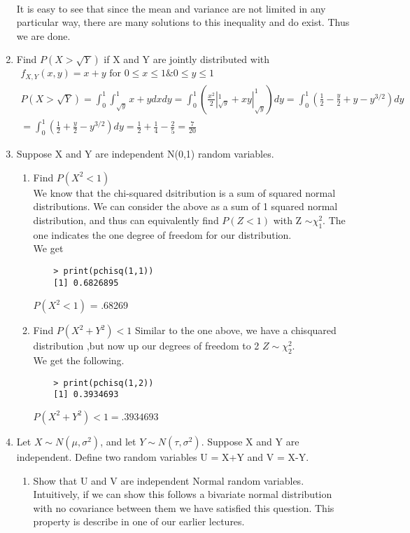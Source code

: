 \documentclass[11pt]{article}
\begin{document}
\begin{enumerate}
\begin{gather}
\end{gather}
It is easy to see that since the mean and variance are not limited in any particular way, there are many solutions to this inequality and do exist. Thus we are done.
\item Find $P(	X>\sqrt{Y})$ if X and Y are jointly distributed with
\begin{gather}
	f_{X,Y}(x,y)=x+y \text{ for } 0\le x \le 1 \& 0\le y\le1\\
	P(X>\sqrt{Y}) = \int_{0}^{1} \int_{\sqrt{y}}^{1} x+y dx dy = \int_{0}^{1} (\frac{x^2}{2}|_{\sqrt{y}}^1 + xy|_{\sqrt{y}}^1)dy = \int_{0}^{1} (\frac{1}{2}-\frac{y}{2} + y -y^{3/2})dy\\
	= \int_{0}^{1} (\frac{1}{2} + \frac{y}{2} - y^{3/2})dy = \frac{1}{2} + \frac{1}{4} - \frac{2}{5} = \frac{7}{20}
\end{gather}
\item Suppose X and Y are independent N(0,1) random variables. 
\begin{enumerate}
	\item Find $P(X^2<1)$\\
	We know that the chi-squared dsitribution is a sum of squared normal distributions. We can consider the above as a sum of 1 squared normal distribution, and thus can equivalently find $P(Z<1)$ with Z $\sim \chi_1^2$. The one indicates the one degree of freedom for our distribution.
	\\
	We get
	\begin{verbatim}
	> print(pchisq(1,1))
	[1] 0.6826895
	\end{verbatim}
	$P(X^2<1)$ = .68269
	\item Find $P(X^2+Y^2)<1$
	Similar to the one above, we have a chisquared distribution ,but now up our degrees of freedom to 2 $Z \sim \chi_2^2$.\\
	We get the following.
	\begin{verbatim}
	> print(pchisq(1,2))
	[1] 0.3934693
	\end{verbatim}
	$P(X^2+Y^2)<1 = .3934693$
\end{enumerate}
\item Let $X \sim N(\mu,\sigma^2)$, and let $Y \sim N(\tau,\sigma^2)$. Suppose X and Y are independent. Define two random variables U = X+Y and V = X-Y. 
\begin{enumerate}
	\item Show that U and V are independent Normal random variables.\\
	Intuitively, if we can show this follows a bivariate normal distribution with no covariance between them we have satisfied this question. This property is describe in one of our earlier lectures.\\

\end{enumerate}
\end{enumerate}
\end{document}

